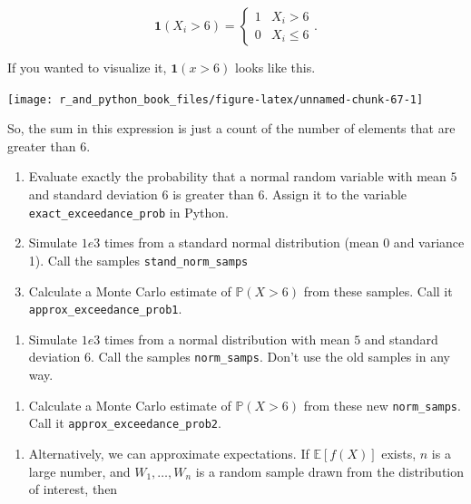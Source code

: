 \documentclass[
  12pt,
  krantz2]{krantz}
\providecommand{\tightlist}{%
  \setlength{\itemsep}{0pt}\setlength{\parskip}{0pt}}
\begin{document}
\[
\mathbf{1}(X_i > 6)
=
\begin{cases}
1 & X_i > 6 \\
0 & X_i \le 6
\end{cases}.
\]

If you wanted to visualize it, \(\mathbf{1}(x > 6)\) looks like this.

\begin{center}\texttt{[image: r\_and\_python\_book\_files/figure-latex/unnamed-chunk-67-1]} \end{center}

So, the sum in this expression is just a count of the number of elements that are greater than \(6\).

\begin{enumerate}
\def\labelenumi{\alph{enumi}.}
\item
  Evaluate exactly the probability that a normal random variable with mean \(5\) and standard deviation \(6\) is greater than \(6\). Assign it to the variable \texttt{exact\_exceedance\_prob} in Python.
\item
  Simulate \(1e3\) times from a standard normal distribution (mean 0 and variance 1). Call the samples \texttt{stand\_norm\_samps}
\item
  Calculate a Monte Carlo estimate of \(\mathbb{P}(X > 6)\) from these samples. Call it \texttt{approx\_exceedance\_prob1}.
\end{enumerate}

\begin{enumerate}
\def\labelenumi{\arabic{enumi}.}
\setcounter{enumi}{3}
\tightlist
\item
  Simulate \(1e3\) times from a normal distribution with mean \(5\) and standard deviation \(6\). Call the samples \texttt{norm\_samps}. Don't use the old samples in any way.
\end{enumerate}

\begin{enumerate}
\def\labelenumi{\alph{enumi}.}
\setcounter{enumi}{3}
\tightlist
\item
  Calculate a Monte Carlo estimate of \(\mathbb{P}(X > 6)\) from these new \texttt{norm\_samps}. Call it \texttt{approx\_exceedance\_prob2}.
\end{enumerate}

\begin{enumerate}
\def\labelenumi{\arabic{enumi}.}
\setcounter{enumi}{3}
\tightlist
\item
  Alternatively, we can approximate expectations. If \(\mathbb{E}[f(X)]\) exists, \(n\) is a large number, and \(W_1, \ldots, W_n\) is a random sample drawn from the distribution of interest, then
\end{enumerate}
\end{document}
